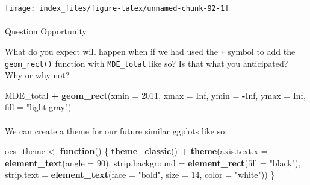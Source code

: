 \documentclass[
]{article}
\newenvironment{Shaded}{\begin{snugshade}}{\end{snugshade}}
\newcommand{\ControlFlowTok}[1]{\textcolor[rgb]{0.13,0.29,0.53}{\textbf{#1}}}
\newcommand{\DataTypeTok}[1]{\textcolor[rgb]{0.13,0.29,0.53}{#1}}
\newcommand{\DecValTok}[1]{\textcolor[rgb]{0.00,0.00,0.81}{#1}}
\newcommand{\KeywordTok}[1]{\textcolor[rgb]{0.13,0.29,0.53}{\textbf{#1}}}
\newcommand{\NormalTok}[1]{#1}
\newcommand{\OperatorTok}[1]{\textcolor[rgb]{0.81,0.36,0.00}{\textbf{#1}}}
\newcommand{\OtherTok}[1]{\textcolor[rgb]{0.56,0.35,0.01}{#1}}
\newcommand{\StringTok}[1]{\textcolor[rgb]{0.31,0.60,0.02}{#1}}
\begin{document}
\begin{Shaded}
\begin{Highlighting}[]
{{{\NormalTok{MDE_total}
\end{Highlighting}
\end{Shaded}

\begin{center}\texttt{[image: index\_files/figure-latex/unnamed-chunk-92-1]} \end{center}

\hypertarget{section-20}{%
\paragraph{}\label{section-20}}

Question Opportunity

What do you expect will happen when if we had used the \texttt{+} symbol
to add the \texttt{geom\_rect()} function with \texttt{MDE\_total} like
so? Is that what you anticipated? Why or why not?

\begin{Shaded}
\begin{Highlighting}[]
\NormalTok{MDE_total }\OperatorTok{+}\StringTok{ }
\StringTok{  }\KeywordTok{geom_rect}\NormalTok{(}\DataTypeTok{xmin =} \DecValTok{2011}\NormalTok{, }\DataTypeTok{xmax =} \OtherTok{Inf}\NormalTok{,  }
            \DataTypeTok{ymin =} \OperatorTok{-}\OtherTok{Inf}\NormalTok{, }\DataTypeTok{ymax =} \OtherTok{Inf}\NormalTok{,  }
            \DataTypeTok{fill =} \StringTok{"light gray"}\NormalTok{)}
\end{Highlighting}
\end{Shaded}

\hypertarget{section-21}{%
\paragraph{}\label{section-21}}

We can create a theme for our future similar ggplots like so:

\begin{Shaded}
\begin{Highlighting}[]
\NormalTok{ocs_theme <-}\StringTok{ }\ControlFlowTok{function}\NormalTok{() \{}
  \KeywordTok{theme_classic}\NormalTok{() }\OperatorTok{+}
\StringTok{  }\KeywordTok{theme}\NormalTok{(}\DataTypeTok{axis.text.x =} \KeywordTok{element_text}\NormalTok{(}\DataTypeTok{angle =} \DecValTok{90}\NormalTok{),}
        \DataTypeTok{strip.background =} \KeywordTok{element_rect}\NormalTok{(}\DataTypeTok{fill =} \StringTok{"black"}\NormalTok{),}
        \DataTypeTok{strip.text =} \KeywordTok{element_text}\NormalTok{(}\DataTypeTok{face =} \StringTok{"bold"}\NormalTok{,}
                                  \DataTypeTok{size =} \DecValTok{14}\NormalTok{,}
                                  \DataTypeTok{color =} \StringTok{"white"}\NormalTok{))}
\NormalTok{  \}}
\end{Highlighting}
\end{Shaded}
\end{document}
